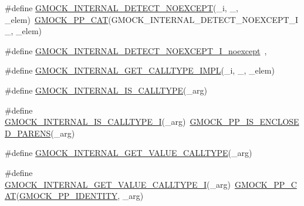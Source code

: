 \begin{DoxyCompactItemize}
\item 
\#define \mbox{\hyperlink{googletest-master_2googlemock_2include_2gmock_2gmock-function-mocker_8h_a86092e1196640ef73dc99eda5f1435f7}{G\+M\+O\+C\+K\+\_\+\+I\+N\+T\+E\+R\+N\+A\+L\+\_\+\+D\+E\+T\+E\+C\+T\+\_\+\+N\+O\+E\+X\+C\+E\+PT}}(\+\_\+i,  \+\_\+,  \+\_\+elem)~\mbox{\hyperlink{_obj__test_2lib_2googletest-master_2googlemock_2include_2gmock_2internal_2gmock-pp_8h_a108c52ffa81ab99348d23b8fa76fded3}{G\+M\+O\+C\+K\+\_\+\+P\+P\+\_\+\+C\+AT}}(G\+M\+O\+C\+K\+\_\+\+I\+N\+T\+E\+R\+N\+A\+L\+\_\+\+D\+E\+T\+E\+C\+T\+\_\+\+N\+O\+E\+X\+C\+E\+P\+T\+\_\+\+I\+\_\+, \+\_\+elem)
\item 
\#define \mbox{\hyperlink{googletest-master_2googlemock_2include_2gmock_2gmock-function-mocker_8h_a8ca220dc4e08e07495b2170862c1dc30}{G\+M\+O\+C\+K\+\_\+\+I\+N\+T\+E\+R\+N\+A\+L\+\_\+\+D\+E\+T\+E\+C\+T\+\_\+\+N\+O\+E\+X\+C\+E\+P\+T\+\_\+\+I\+\_\+noexcept}}~,
\item 
\#define \mbox{\hyperlink{googletest-master_2googlemock_2include_2gmock_2gmock-function-mocker_8h_a917552654709591f0b38c20f16018b1e}{G\+M\+O\+C\+K\+\_\+\+I\+N\+T\+E\+R\+N\+A\+L\+\_\+\+G\+E\+T\+\_\+\+C\+A\+L\+L\+T\+Y\+P\+E\+\_\+\+I\+M\+PL}}(\+\_\+i,  \+\_\+,  \+\_\+elem)
\item 
\#define \mbox{\hyperlink{googletest-master_2googlemock_2include_2gmock_2gmock-function-mocker_8h_a9563724309b2deb14c3df5b2b4176038}{G\+M\+O\+C\+K\+\_\+\+I\+N\+T\+E\+R\+N\+A\+L\+\_\+\+I\+S\+\_\+\+C\+A\+L\+L\+T\+Y\+PE}}(\+\_\+arg)
\item 
\#define \mbox{\hyperlink{googletest-master_2googlemock_2include_2gmock_2gmock-function-mocker_8h_a040a6d22837754efcafe8e3026eee515}{G\+M\+O\+C\+K\+\_\+\+I\+N\+T\+E\+R\+N\+A\+L\+\_\+\+I\+S\+\_\+\+C\+A\+L\+L\+T\+Y\+P\+E\+\_\+I}}(\+\_\+arg)~\mbox{\hyperlink{_obj__test_2lib_2googletest-master_2googlemock_2include_2gmock_2internal_2gmock-pp_8h_a10bbc38452431607a40619475c5248aa}{G\+M\+O\+C\+K\+\_\+\+P\+P\+\_\+\+I\+S\+\_\+\+E\+N\+C\+L\+O\+S\+E\+D\+\_\+\+P\+A\+R\+E\+NS}}(\+\_\+arg)
\item 
\#define \mbox{\hyperlink{googletest-master_2googlemock_2include_2gmock_2gmock-function-mocker_8h_a4d17f3f1aaca9e73e7c5ca5d73fa8f05}{G\+M\+O\+C\+K\+\_\+\+I\+N\+T\+E\+R\+N\+A\+L\+\_\+\+G\+E\+T\+\_\+\+V\+A\+L\+U\+E\+\_\+\+C\+A\+L\+L\+T\+Y\+PE}}(\+\_\+arg)
\item 
\#define \mbox{\hyperlink{googletest-master_2googlemock_2include_2gmock_2gmock-function-mocker_8h_ad532f0c99206358320dedf9ca0d89a56}{G\+M\+O\+C\+K\+\_\+\+I\+N\+T\+E\+R\+N\+A\+L\+\_\+\+G\+E\+T\+\_\+\+V\+A\+L\+U\+E\+\_\+\+C\+A\+L\+L\+T\+Y\+P\+E\+\_\+I}}(\+\_\+arg)~\mbox{\hyperlink{_obj__test_2lib_2googletest-master_2googlemock_2include_2gmock_2internal_2gmock-pp_8h_a108c52ffa81ab99348d23b8fa76fded3}{G\+M\+O\+C\+K\+\_\+\+P\+P\+\_\+\+C\+AT}}(\mbox{\hyperlink{_obj__test_2lib_2googletest-master_2googlemock_2include_2gmock_2internal_2gmock-pp_8h_a6123441ddc433915bfc8996a0a4eb397}{G\+M\+O\+C\+K\+\_\+\+P\+P\+\_\+\+I\+D\+E\+N\+T\+I\+TY}}, \+\_\+arg)

\end{DoxyCompactItemize}
